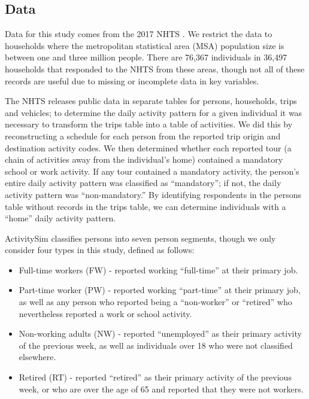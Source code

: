 \documentclass[3p, authoryear, review]{elsarticle} %
\providecommand{\tightlist}{%
  \setlength{\itemsep}{0pt}\setlength{\parskip}{0pt}}
\begin{document}
\hypertarget{data}{%
\subsection{Data}\label{data}}

Data for this study comes from the 2017 NHTS \cite{nhts2017}. We restrict the
data to households where the metropolitan statistical area (MSA) population size
is between one and three million people. There are 76,367 individuals in 36,497
households that responded to the NHTS from these areas, though not all of these
records are useful due to missing or incomplete data in key variables.

The NHTS releases public data in separate tables for persons, households,
trips and vehicles; to determine the daily activity pattern for a given
individual it was necessary to transform the trips table into a table of
activities. We did this by reconstructing a schedule for each person from the
reported trip origin and destination activity codes. We then determined whether
each reported tour (a chain of activities away from the individual's home)
contained a mandatory school or work activity. If any tour contained a mandatory
activity, the person's entire daily activity pattern was classified as ``mandatory'';
if not, the daily activity pattern was ``non-mandatory.'' By identifying respondents
in the persons table without records in the trips table, we can determine
individuals with a ``home'' daily activity pattern.

ActivitySim classifies persons into seven person segments, though we only
consider four types in this study, defined as follows:

\begin{itemize}
\tightlist
\item
  Full-time workers (FW) - reported working ``full-time'' at their primary job.
\item
  Part-time worker (PW) - reported working ``part-time'' at their primary job,
  as well as any person who reported being a ``non-worker'' or ``retired'' who nevertheless
  reported a work or school activity.
\item
  Non-working adults (NW) - reported ``unemployed'' as their primary activity
  of the previous week, as well as individuals over 18 who were not classified
  elsewhere.
\item
  Retired (RT) - reported ``retired'' as their primary activity of the previous
  week, or who are over the age of 65 and reported that they were not workers.
\end{itemize}
\end{document}
